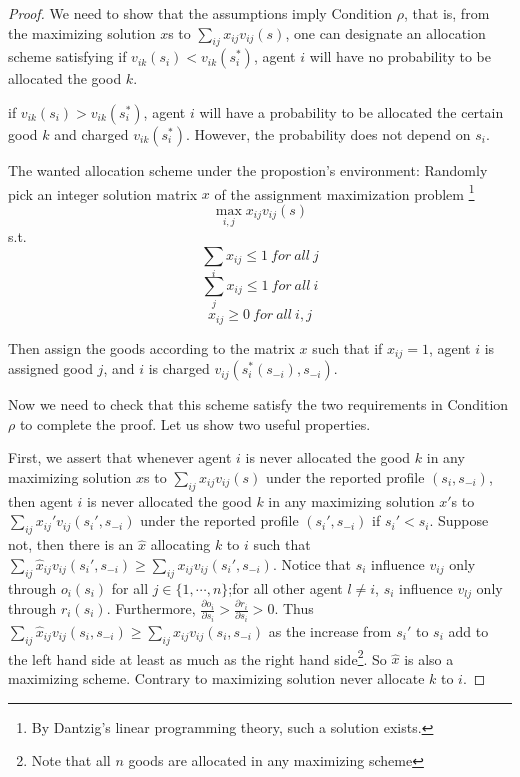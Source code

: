 \begin{proof}
  We need to show that the assumptions imply Condition $\rho$, that is, from the maximizing solution $x$s to  $\sum_{ij}x_{ij}v_{ij}(s)$, one can designate an allocation scheme satisfying
  if $v_{ik}(s_i) < v_{ik}(s_i^*)$, agent $i$ will have no probability to be allocated the good $k$. %

  if $v_{ik}(s_i) > v_{ik}(s_i^*)$, agent $i$ will have a probability to be allocated the certain good $k$ and charged $ v_{ik}(s_i^*)$. However, the probability does not depend on $s_i$.

  The wanted allocation scheme under the propostion's environment: Randomly pick an integer solution matrix $x$ of  the assignment maximization problem \footnote{By Dantzig's linear programming theory, such a solution exists.} 
 $$\max_{i,j}x_{ij}v_{ij}(s)$$
 s.t.
 $$\sum_i x_{ij} \leq 1\ for\ all\ j $$
 $$\sum_j x_{ij} \leq 1\ for\ all\ i $$
 $$x_{ij} \geq 0\ for\ all\ i,j $$

 Then assign the goods according to the matrix $x$ such that if $x_{ij}=1$, agent $i$ is assigned good $j$, and $i$ is
 charged $v_{ij}(s_i^*(s_{-i}), s_{-i})$.


 Now we need to check that this scheme satisfy the two requirements in Condition $\rho$ to complete the proof. Let us show two useful properties.

 First, we assert that whenever agent $i$ is never allocated the good $k$ in any maximizing solution $x$s to  $\sum_{ij}x_{ij}v_{ij}(s)$ under the reported profile $(s_i,s_{-i})$, then agent $i$ is never allocated the good $k$ in any maximizing solution $x'$s to  $\sum_{ij}x_{ij}'v_{ij}(s_i', s_{-i})$ under the reported profile $(s_i',s_{-i})$ if $s_i' < s_i$. Suppose not, then there is an $\hat{x}$ allocating $k$ to $i$ such that $\sum_{ij}\hat{x}_{ij}v_{ij}(s_i', s_{-i}) \geq \sum_{ij}x_{ij}v_{ij}(s_i',s_{-i})$. Notice that $s_i$ influence $v_{ij}$ only through $o_i(s_i)$ for all $j \in \{1,\cdots,n\}$;for all other agent $l \not = i$, $s_i$ influence $v_{lj}$ only through $r_i(s_i)$. Furthermore, $\frac{\partial o_i}{\partial s_i}> \frac{\partial r_i}{\partial s_i} > 0$. Thus $\sum_{ij}\hat{x}_{ij}v_{ij}(s_i, s_{-i}) \geq \sum_{ij}x_{ij}v_{ij}(s_i,s_{-i})$ as the increase from $s_i'$ to $s_i$ add to the left hand side at least as much as the right hand side\footnote{Note that all $n$ goods are allocated in any maximizing scheme}. So $\hat{x}$ is also a maximizing scheme. Contrary to  maximizing solution never allocate $k$ to $i$.


\end{proof}
